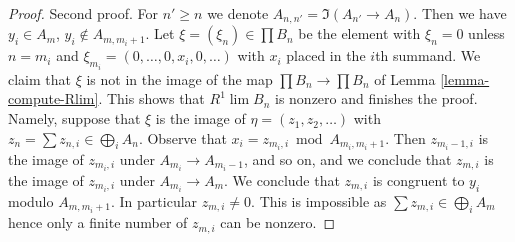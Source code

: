 \begin{proof}
\medskip\noindent
Second proof. For $n' \geq n$ we denote $A_{n, n'} = \Im(A_{n'} \to A_n)$.
Then we have $y_i \in A_m$, $y_i \not \in A_{m, m_i + 1}$.
Let $\xi = (\xi_n) \in \prod B_n$ be the element with
$\xi_n = 0$ unless $n = m_i$ and $\xi_{m_i} = (0, \ldots, 0, x_i, 0, \ldots)$
with $x_i$ placed in the $i$th summand. We claim that $\xi$ is not in the
image of the map $\prod B_n \to \prod B_n$ of Lemma \ref{lemma-compute-Rlim}.
This shows that $R^1\lim B_n$ is nonzero and finishes the proof.
Namely, suppose that $\xi$ is the image of $\eta = (z_1, z_2, \ldots)$
with $z_n = \sum z_{n, i} \in \bigoplus_i A_n$.
Observe that $x_i = z_{m_i, i} \bmod A_{m_i, m_i + 1}$.
Then $z_{m_i - 1, i}$ is the image of $z_{m_i, i}$ under
$A_{m_i} \to A_{m_i - 1}$, and so on, and we conclude that
$z_{m, i}$ is the image of $z_{m_i, i}$ under $A_{m_i} \to A_m$.
We conclude that $z_{m, i}$ is congruent to $y_i$ modulo
$A_{m, m_i + 1}$. In particular $z_{m, i} \not = 0$.
This is impossible as $\sum z_{m, i} \in \bigoplus_i A_m$
hence only a finite number of $z_{m, i}$ can be nonzero.
\end{proof}